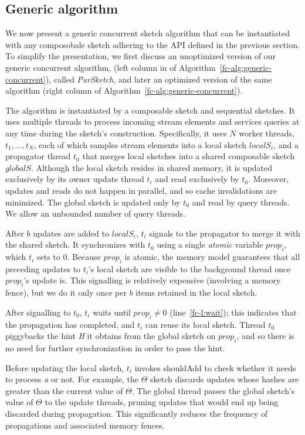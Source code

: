 \subsection{Generic algorithm}
\label{fc-sec:basic-generic-alg}

We now present a generic concurrent sketch algorithm that can be instantiated with any composobale sketch adhering to the API defined in the previous section. To simplify the presentation, we first discuss an unoptimized version of
our generic concurrent algorithm, (left column in of Algorithm~\ref{fc-alg:generic-concurrent}),  called 
\emph{ParSketch}, and later an optimized version of the same algorithm (right column of Algorithm~\ref{fc-alg:generic-concurrent}).

The algorithm is instantiated by a composable sketch and sequential sketches.
It uses multiple threads to process incoming stream elements 
and services queries at any time during the sketch's construction.
Specifically, it uses $N$ worker threads, $t_1,\dots,t_N$, each of which samples
stream elements into a local sketch $localS_i$, and a propagator thread $t_0$ that merges local sketches
into a shared composable sketch $globalS$. Although the local sketch resides in
shared memory, it is updated exclusively by its owner update thread $t_i$ and 
read exclusively by $t_0$. Moreover, updates and reads do not happen in
parallel, and so cache invalidations are minimized. The global sketch is updated only by $t_0$
and read by query threads. We allow an unbounded number of query threads. 

After $b$ updates are added to $localS_i$, $t_i$ signals to the propagator to merge
it with the shared sketch. It synchronizes with $t_0$ using a 
single \emph{atomic} variable $prop_i$, which $t_i$ sets to 0.  
Because $prop_i$ is atomic, the memory model
guarantees that all preceding updates to $t_i$'s local sketch are visible to
the background thread once $prop_i$'s update is.
This signalling is relatively expensive (involving a memory fence),  
but we do it only once per $b$ items retained in the local sketch.

After signalling to $t_0$, $t_i$ waits
until $prop_i \neq 0$  (line~\ref{fc-l:wait}); 
this indicates that the propagation has completed, and $t_i$ can 
reuse its local sketch. Thread $t_0$ piggybacks the hint \emph{H} it
obtains from the global sketch on $prop_i$,
and so there is no need for further synchronization in order to pass the hint.

Before updating the local sketch, $t_i$ invokes shouldAdd to check
whether it needs to process \emph{a} or not. For example, the $\Theta$ sketch discards updates whose hashes are
greater than the current value of $\Theta$. The global thread passes the global sketch's
value of $\Theta$ to the update threads, pruning updates that would end up being discarded
during propagation. This significantly
reduces the frequency of propagations and associated memory fences.

